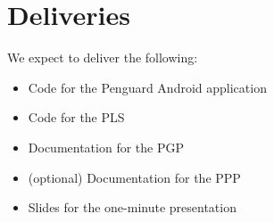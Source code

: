 \documentclass{report}
\begin{document}



\section{Deliveries}

We expect to deliver the following:

\begin{itemize}
    \item Code for the Penguard Android application
    \item Code for the PLS
    \item Documentation for the PGP
    \item (optional) Documentation for the PPP
    \item Slides for the one-minute presentation
\end{itemize}
\end{document}
